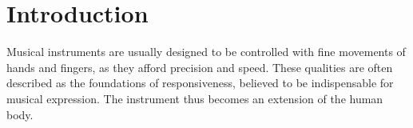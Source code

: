 \documentclass{nime-alternate_ADJ} %
\begin{document}
%
% 
%


\printccsdesc

\section{Introduction}

Musical instruments are usually designed to be controlled with fine movements of hands and fingers, as they afford precision and speed. These qualities are often described as the foundations of responsiveness, believed to be indispensable for musical expression. The instrument thus becomes an extension of the human body. 
\end{document}
